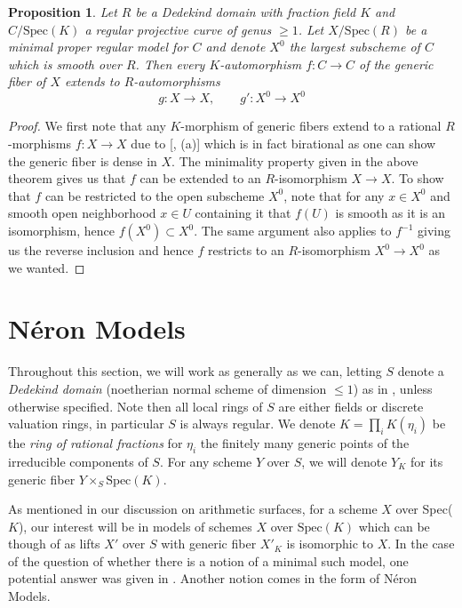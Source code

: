 \documentclass{article}
\theoremstyle{definition}
\theoremstyle{remark}
\theoremstyle{plain}
\newtheorem{proposition}[theorem]{Proposition}
\begin{document}
\begin{proposition}\label{prop:1.13}
	Let $R$ be a Dedekind domain with fraction field $K$ and $C/\text{Spec}(K)$ a regular projective curve of genus $\geq 1$.
	Let $X/\text{Spec}(R)$ be a minimal proper regular model for $C$ and denote $X^0$ the largest subscheme of $C$ which is smooth over $R$.
	Then every $K$-automorphism $f: C \to C$ of the generic fiber of $X$ extends to $R$-automorphisms 
	\[g: X \to X, \quad \quad  g': X^0 \to X^0\]
\end{proposition}

\begin{proof}
	We first note that any $K$-morphism of generic fibers extend to a rational $R$-morphisms $f: X \to X$ due to [, (a)] which is in fact birational as one can show the generic fiber is dense in $X$.
	The minimality property given in the above theorem gives us that $f$ can be extended to an $R$-isomorphism $X \to X$.
	To show that $f$ can be restricted to the open subscheme $X^0$, note that for any $x \in X^0$ and smooth open neighborhood $x \in U$ containing it that $f(U)$ is smooth as it is an isomorphism, hence $f(X^0) \subset X^0$.
	The same argument also applies to $f^{-1}$ giving us the reverse inclusion and hence $f$ restricts to an $R$-isomorphism $X^0 \to X^0$ as we wanted.
\end{proof}

\section{N\'eron Models}

Throughout this section, we will work as generally as we can, letting $S$ denote a \textit{Dedekind domain} (noetherian normal scheme of dimension $\leq 1$) as in \cite{BLR}, unless otherwise specified. 
Note then all local rings of $S$ are either fields or discrete valuation rings, in particular $S$ is always regular.
We denote $K = \prod_{i} K(\eta_i)$ be the \textit{ring of rational fractions} for $\eta_i$ the finitely many generic points of the irreducible components of $S$. 
For any scheme $Y$ over $S$, we will denote $Y_K$ for its generic fiber $Y \times_{S} \text{Spec}(K)$. \newline

\indent As mentioned in our discussion on arithmetic surfaces, for a scheme $X$ over Spec($K$), our interest will be in models of schemes $X$ over $\text{Spec}(K)$ which can be though of as lifts $X'$ over $S$ with generic fiber $X'_K$ is isomorphic to $X$. 
In the case of the question of whether there is a notion of a minimal such model, one potential answer was given in . 
Another notion comes in the form of N\'eron Models.
\end{document}
